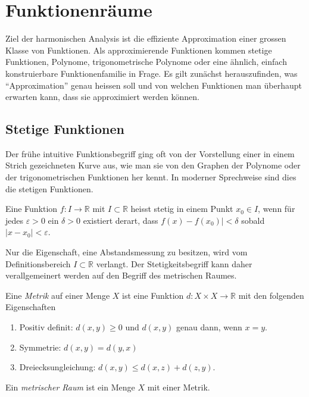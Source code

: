 %
%
%
\section{Funktionenräume
\label{buch:skalarprodukt:section:funktionenraeume}}
Ziel der harmonischen Analysis ist die effiziente Approximation einer
grossen Klasse von Funktionen.
Als approximierende Funktionen kommen stetige Funktionen, Polynome,
trigonometrische Polynome oder eine ähnlich, einfach konstruierbare
Funktionenfamilie in Frage.
Es gilt zunächst herauszufinden, was ``Approximation'' genau heissen
soll und von welchen Funktionen man überhaupt erwarten kann, dass sie
approximiert werden können.

%
%
\subsection{Stetige Funktionen
\label{buch:skalarprodukt:subsection:stetige-funktionen}}
Der frühe intuitive Funktionsbegriff ging oft von der Vorstellung einer
in einem Strich gezeichneten Kurve aus, wie man sie von den Graphen
der Polynome oder der trigonometrischen Funktionen her kennt.
In moderner Sprechweise sind dies die stetigen Funktionen.

\begin{definition}
Eine Funktion $f\colon I\to\mathbb{R}$ mit $I\subset \mathbb{R}$
heisst stetig in einem Punkt $x_0\in I$, wenn für jedes $\varepsilon>0$
ein $\delta>0$ existiert derart, dass $f(x)-f(x_0)|<\delta$ sobald
$|x-x_0|<\varepsilon$.
\end{definition}

Nur die Eigenschaft, eine Abstandsmessung zu besitzen, wird vom
Definitionsbereich $I\subset \mathbb{R}$ verlangt.
Der Stetigkeitsbegriff kann daher verallgemeinert werden auf den
Begriff des metrischen Raumes.

\begin{definition}
Eine {\em Metrik} auf einer Menge $X$ ist eine Funktion
%
$d\colon X\times X\to \mathbb{R}$
mit den folgenden Eigenschaften
\begin{enumerate}
\item
Positiv definit: $d(x,y)\ge 0$ und $d(x,y)$ genau dann, wenn $x=y$.
\item
Symmetrie: \(d(x,y)=d(y,x)\)
\item
Dreiecksungleichung: \( d(x,y) \le d(x,z) + d(z,y) \).
\end{enumerate}
Ein {\em metrischer Raum} ist ein Menge $X$ mit einer Metrik.
%
\end{definition}

